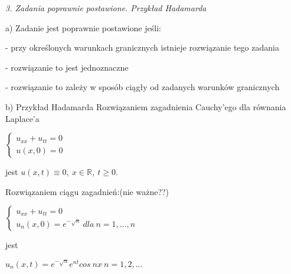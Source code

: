 \textit{3. Zadania poprawnie postawione. Przykład Hadamarda}

a) Zadanie jest poprawnie postawione jeśli:

  - przy określonych warunkach granicznych istnieje rozwiązanie tego zadania
  
  - rozwiązanie to jest jednoznaczne

  - rozwiązanie to zależy w sposób ciągły od zadanych warunków granicznych

b) Przykład Hadamarda
Rozwiązaniem zagadnienia Cauchy'ego dla równania Laplace'a

$\left\{\begin{matrix} u_{xx} + u_{tt} = 0 \\ u(x,0) = 0 \end{matrix}\right.$

jest $u(x,t) \equiv 0,\ x \in \mathbb{R},\ t \geqslant 0$.

Rozwiązaniem ciągu zagadnień:(nie ważne??)

$\left\{\begin{matrix} u_{xx} + u_{tt} = 0 \\ u_n(x,0) = e^{-\sqrt{n}}\ dla\ n = 1, ..., n \end{matrix}\right.$

jest

$u_n(x,t) = e^{-\sqrt{n}}e^{nt}cos\ nx\  n = 1, 2, ...$


